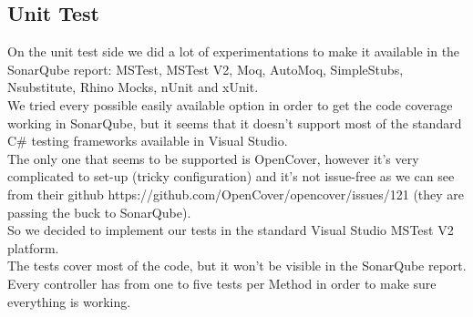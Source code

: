 \documentclass[12pt]{article}
\begin{document}
\subsection{Unit Test}
On the unit test side we did a lot of experimentations to make it available in the 
SonarQube report: MSTest, MSTest V2, Moq, AutoMoq, SimpleStubs, Nsubstitute, Rhino Mocks, nUnit and xUnit.\\
\linebreak
We tried every possible easily available option in order to get the code coverage working in SonarQube, but it seems that it doesn't support most of the standard C\# testing frameworks available in Visual Studio.\\
\linebreak
The only one that seems to be supported is OpenCover, however it's very complicated to set-up (tricky configuration) and it's not issue-free as we can see from
their github https://github.com/OpenCover/opencover/issues/121 (they are passing the buck to SonarQube).\\
\linebreak
So we decided to implement our tests in the standard Visual Studio MSTest V2 platform.\\
The tests cover most of the code, but it won't be visible in the SonarQube report.\\
Every controller has from one to five tests per Method in order to make sure everything is working.
\end{document}
